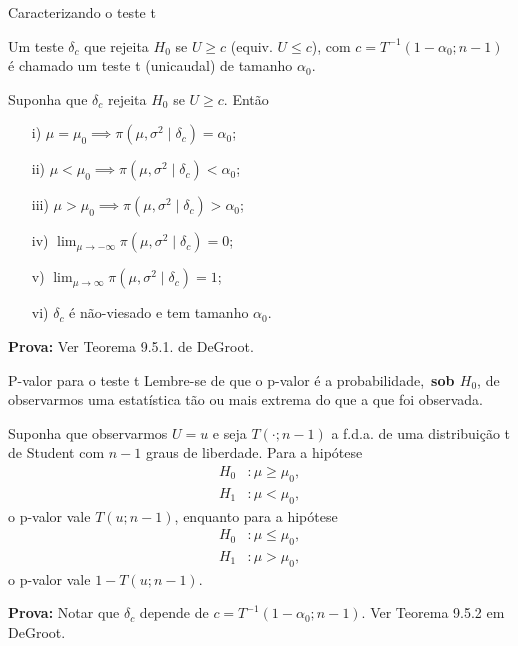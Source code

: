 \begin{frame}{Caracterizando o teste t}
\begin{defn}[Teste t]
\label{def:Student_t_test}
Um teste $\delta_c$ que rejeita $H_0$ se $U\geq c$ (equiv. $U \leq c$), com $c = T^{-1}(1-\alpha_0; n-1)$ é chamado um teste t (unicaudal) de tamanho $\alpha_0$.
\end{defn}
\begin{theo}
Suponha que $\delta_c$ rejeita $H_0$ se $U\geq c$.
Então
\begin{itemize}
 \item [i)] $\mu = \mu_0 \implies \pi(\mu, \sigma^2 \mid \delta_c) = \alpha_0$;
 \item [ii)] $\mu < \mu_0 \implies \pi(\mu, \sigma^2 \mid \delta_c) < \alpha_0$;
 \item [iii)] $\mu > \mu_0 \implies \pi(\mu, \sigma^2 \mid \delta_c) > \alpha_0$;
 \item [iv)] $\lim_{\mu \to -\infty}  \pi(\mu, \sigma^2 \mid \delta_c) = 0$;
 \item [v)] $\lim_{\mu \to \infty}  \pi(\mu, \sigma^2 \mid \delta_c) = 1$;
 \item [vi)] $\delta_c$ é não-viesado e tem tamanho $\alpha_0$.
\end{itemize}
\end{theo}
\textbf{Prova:} Ver Teorema 9.5.1. de DeGroot. 
\end{frame}

\begin{frame}{P-valor para o teste t}
 Lembre-se de que o p-valor é a probabilidade,~\textbf{sob $H_0$}, de observarmos uma estatística tão ou mais extrema do que a que foi observada.
 \begin{theo}
 \label{thm:pvalue_one_tailed}
 Suponha que observarmos $U = u$ e seja $T(\cdot; n-1)$ a f.d.a. de uma distribuição t de Student com $n-1$ graus de liberdade.
 Para a hipótese
\begin{align*}
   H_0 &: \mu \geq \mu_0, \\
   H_1&:  \mu < \mu_0,
  \end{align*}
o p-valor vale $T(u;n-1)$, enquanto para a hipótese
\begin{align*}
   H_0 &: \mu \leq \mu_0, \\
   H_1&:  \mu > \mu_0,
  \end{align*}
o p-valor vale $1-T(u; n-1)$.   
 \end{theo}
 \textbf{Prova:} Notar que $\delta_c$ depende de $c = T^{-1}(1-\alpha_0; n-1)$.
Ver Teorema 9.5.2 em DeGroot. 
\end{frame}

